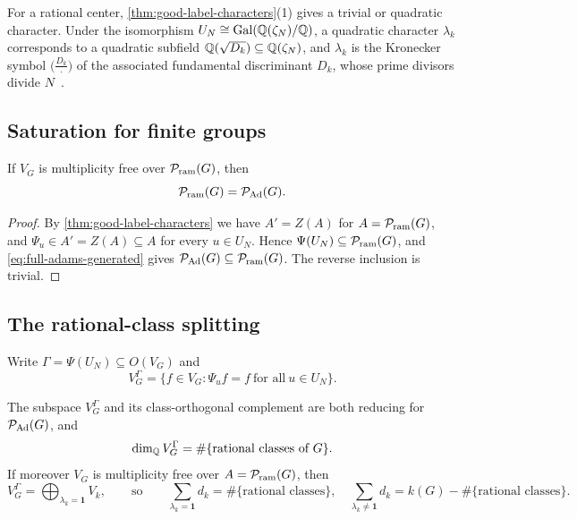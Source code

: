 For a rational center, \cref{thm:good-label-characters}(1) gives a trivial
or quadratic character.  Under the isomorphism
\(U_N\cong\operatorname{Gal}(\mathbb Q(\zeta_N)/\mathbb Q)\), a quadratic character
\(\lambda_k\) corresponds to a quadratic subfield
\(\mathbb Q(\sqrt{D_k})\subseteq\mathbb Q(\zeta_N)\), and \(\lambda_k\) is the Kronecker
symbol \(\bigl(\tfrac{D_k}{\cdot}\bigr)\) of the associated fundamental
discriminant \(D_k\), whose prime divisors divide \(N\)~\cite{Davenport}.

\subsection{Saturation for finite groups}

\begin{theorem}
\label{thm:good-label-saturation}
If \(V_G\) is multiplicity free over \(\mathcal P_{\mathrm{ram}}(G)\), then
\begin{equation}
 \mathcal P_{\mathrm{ram}}(G)=\mathcal P_{\mathrm{Ad}}(G).
 \label{eq:ram-equals-ad}
\end{equation}
\end{theorem}

\begin{proof}
By \cref{thm:good-label-characters} we have \(A'=Z(A)\) for
\(A=\mathcal P_{\mathrm{ram}}(G)\), and \(\Psi_u\in A'=Z(A)\subseteq A\) for every \(u\in U_N\).
Hence \(\Psi(U_N)\subseteq\mathcal P_{\mathrm{ram}}(G)\), and
\eqref{eq:full-adams-generated} gives
\(\mathcal P_{\mathrm{Ad}}(G)\subseteq\mathcal P_{\mathrm{ram}}(G)\).  The reverse inclusion is trivial.
\end{proof}

\subsection{The rational-class splitting}

Write
\(\Gamma=\Psi(U_N)\subseteq O(V_G)\) and
\[
 V_G^{\Gamma}=\{f\in V_G:\Psi_uf=f\ \text{for all}\ u\in U_N\}.
\]

\begin{proposition}
\label{prop:rational-splitting}
The subspace \(V_G^{\Gamma}\) and its class-orthogonal complement are both
reducing for \(\mathcal P_{\mathrm{Ad}}(G)\), and
\begin{equation}
 \dim_\mathbb Q V_G^{\Gamma}=\#\{\text{rational classes of }G\}.
 \label{eq:rational-class-dimension}
\end{equation}
If moreover \(V_G\) is multiplicity free over \(A=\mathcal P_{\mathrm{ram}}(G)\), then
\begin{equation}
 V_G^{\Gamma}=\bigoplus_{\lambda_k=\mathbf1}V_k,
 \qquad\text{so}\qquad
 \sum_{\lambda_k=\mathbf1}d_k=\#\{\text{rational classes}\},
 \quad
 \sum_{\lambda_k\neq\mathbf1}d_k=k(G)-\#\{\text{rational classes}\}.
 \label{eq:trivial-block-sum}
\end{equation}
\end{proposition}

